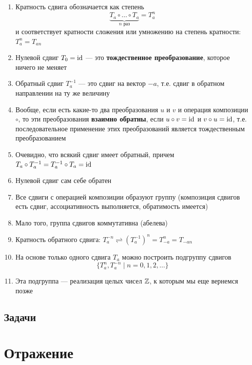 \begin{enumerate}
\item Кратность сдвига обозначается как степень
$$
\underbrace{T_a\circ\dots\circ T_a}_{n\mbox{ раз}}=T_a^n
$$
и соответствует кратности сложения или умножению на степень кратности: $T_a^n=T_{an}$
\item Нулевой сдвиг $T_0=\mathrm{id}$ --- это \textbf{тождественное преобразование}, которое ничего не меняет
\item Обратный сдвиг $T_a^{-1}$ --- это сдвиг на вектор $-a$, т.е. сдвиг в обратном направлении на ту же величину
\item Вообще, если есть какие-то два преобразования $u$ и $v$ и операция композиции $\circ$, то эти преобразования \textbf{взаимно обратны}, если $u\circ v=\mathrm{id}$ и $v\circ u=\mathrm{id}$, т.е. последовательное применение этих преобразований является тождественным преобразованием
\item Очевидно, что всякий сдвиг имеет обратный, причем $T_a\circ T_a^{-1}=T_a^{-1}\circ T_a=\mathrm{id}$
\item Нулевой сдвиг сам себе обратен
\item Все сдвиги с операцией композиции образуют группу (композиция сдвигов есть сдвиг, ассоциативность выполняется, обратимость имеется)
\item Мало того, группа сдвигов коммутативна (абелева)
\item Кратность обратного сдвига: $T_a^{-n}\rightleftharpoons (T_a^{-1})^n=T_{-a}^n=T_{-an}$
\item На основе только одного сдвига $T_a$ можно построить подгруппу сдвигов $$\{T_a^n, T_a^{-n}\;|\; n=0,1,2,\dots\}$$
\item Эта подгруппа --- реализация целых чисел $\mathbb Z$, к которым мы еще вернемся позже
\end{enumerate}
\subsection{Задачи}



\section{Отражение}


